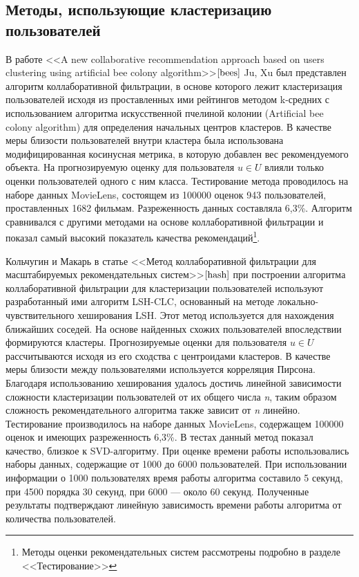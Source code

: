 \documentclass[a4paper, 12pt]{article} %
\begin{document}
\subsection{Методы, использующие кластеризацию пользователей}
\par
В работе <<A new collaborative recommendation approach based on users clustering using artificial bee colony algorithm>>$\cite{bees}$ Ju, Xu был представлен алгоритм коллаборативной фильтрации, в основе которого лежит кластеризация пользователей исходя из проставленных ими рейтингов методом k-средних с использованием алгоритма искусственной пчелиной колонии (Artificial bee colony algorithm) для определения начальных центров кластеров. В качестве меры близости пользователей внутри кластера была использована модифицированная косинусная метрика, в которую добавлен вес рекомендуемого объекта. На прогнозируемую оценку для пользователя $u \in U$  влияли только оценки пользователей одного с ним класса. Тестирование метода проводилось на наборе данных MovieLens, состоящем из 100000 оценок 943 пользователей, проставленных 1682 фильмам. Разреженность данных составляла 6,3\%. Алгоритм сравнивался с другими методами на основе коллаборативной фильтрации и показал самый высокий показатель качества рекомендаций\footnote{Методы оценки рекомендательных систем рассмотрены подробно в разделе <<Тестирование>>}.

\par 
Кольчугин и Макарь в статье <<Метод коллаборативной фильтрации для масштабируемых рекомендательных систем>>$\cite{hash}$ при построении алгоритма коллаборативной фильтрации для кластеризации пользователей используют разработанный ими алгоритм LSH-CLC, основанный на методе локально-чувствительного хеширования LSH. Этот метод используется для нахождения ближайших соседей. На основе найденных схожих пользователей впоследствии формируются кластеры. Прогнозируемые оценки для пользователя $u \in U$ рассчитываются исходя из его сходства с центроидами кластеров. В качестве меры близости между пользователями используется корреляция Пирсона. Благодаря использованию хеширования удалось достичь линейной зависимости сложности кластеризации пользователей от их общего числа \textit{n}, таким образом сложность рекомендательного алгоритма также зависит от \textit{n} линейно. Тестирование производилось на наборе данных MovieLens, содержащем 100000 оценок и имеющих разреженность 6,3\%. В тестах данный метод показал качество, близкое к SVD-алгоритму. При оценке времени работы использовались наборы данных, содержащие от 1000 до 6000 пользователей. При использовании информации о 1000 пользователях время работы алгоритма составило 5 секунд, при 4500 порядка 30 секунд, при 6000 --- около 60 секунд. Полученные результаты подтверждают линейную зависимость времени работы алгоритма от количества пользователей.  
\end{document}
